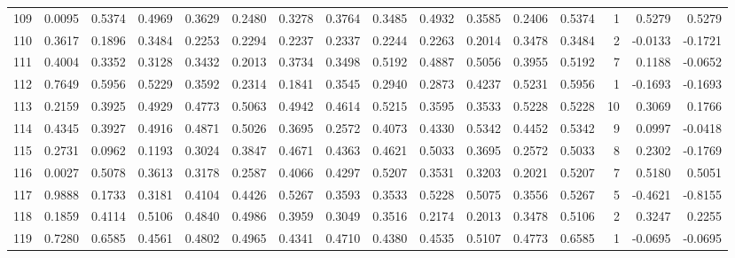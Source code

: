 \begin{tabular}{lrrrrrrrrrrrrrrr}
109 &      0.0095 &  0.5374 &  0.4969 &  0.3629 &  0.2480 &  0.3278 &  0.3764 &  0.3485 &  0.4932 &  0.3585 &   0.2406 &     0.5374 &      1 &                    0.5279 &                     0.5279 \\
110 &      0.3617 &  0.1896 &  0.3484 &  0.2253 &  0.2294 &  0.2237 &  0.2337 &  0.2244 &  0.2263 &  0.2014 &   0.3478 &     0.3484 &      2 &                   -0.0133 &                    -0.1721 \\
111 &      0.4004 &  0.3352 &  0.3128 &  0.3432 &  0.2013 &  0.3734 &  0.3498 &  0.5192 &  0.4887 &  0.5056 &   0.3955 &     0.5192 &      7 &                    0.1188 &                    -0.0652 \\
112 &      0.7649 &  0.5956 &  0.5229 &  0.3592 &  0.2314 &  0.1841 &  0.3545 &  0.2940 &  0.2873 &  0.4237 &   0.5231 &     0.5956 &      1 &                   -0.1693 &                    -0.1693 \\
113 &      0.2159 &  0.3925 &  0.4929 &  0.4773 &  0.5063 &  0.4942 &  0.4614 &  0.5215 &  0.3595 &  0.3533 &   0.5228 &     0.5228 &     10 &                    0.3069 &                     0.1766 \\
114 &      0.4345 &  0.3927 &  0.4916 &  0.4871 &  0.5026 &  0.3695 &  0.2572 &  0.4073 &  0.4330 &  0.5342 &   0.4452 &     0.5342 &      9 &                    0.0997 &                    -0.0418 \\
115 &      0.2731 &  0.0962 &  0.1193 &  0.3024 &  0.3847 &  0.4671 &  0.4363 &  0.4621 &  0.5033 &  0.3695 &   0.2572 &     0.5033 &      8 &                    0.2302 &                    -0.1769 \\
116 &      0.0027 &  0.5078 &  0.3613 &  0.3178 &  0.2587 &  0.4066 &  0.4297 &  0.5207 &  0.3531 &  0.3203 &   0.2021 &     0.5207 &      7 &                    0.5180 &                     0.5051 \\
117 &      0.9888 &  0.1733 &  0.3181 &  0.4104 &  0.4426 &  0.5267 &  0.3593 &  0.3533 &  0.5228 &  0.5075 &   0.3556 &     0.5267 &      5 &                   -0.4621 &                    -0.8155 \\
118 &      0.1859 &  0.4114 &  0.5106 &  0.4840 &  0.4986 &  0.3959 &  0.3049 &  0.3516 &  0.2174 &  0.2013 &   0.3478 &     0.5106 &      2 &                    0.3247 &                     0.2255 \\
119 &      0.7280 &  0.6585 &  0.4561 &  0.4802 &  0.4965 &  0.4341 &  0.4710 &  0.4380 &  0.4535 &  0.5107 &   0.4773 &     0.6585 &      1 &                   -0.0695 &                    -0.0695 \\

\end{tabular}
